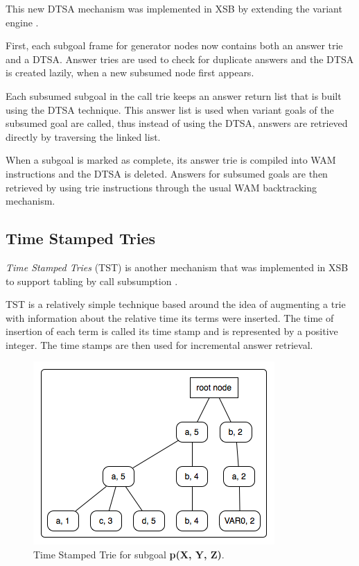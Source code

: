   This new DTSA mechanism was implemented in XSB by extending the variant engine \cite{Rao-96}.
  
  First, each subgoal frame for generator nodes now contains both an answer trie and a DTSA.
  Answer tries are used to check for duplicate answers and the DTSA is created lazily, when a new subsumed node
  first appears.
  
  Each subsumed subgoal in the call trie keeps an answer return list that is built using the DTSA technique.
  This answer list is used when variant goals of the subsumed goal are called, thus instead of using
  the DTSA, answers are retrieved directly by traversing the linked list.
  
  When a subgoal is marked as complete, its answer trie is compiled into WAM instructions and the DTSA is deleted.
  Answers for subsumed goals are then retrieved by using trie instructions through the usual WAM backtracking
  mechanism.
  
\subsection{Time Stamped Tries} \label{sec:time_stamped_tries}

  \textit{Time Stamped Tries} (TST) is another mechanism that was implemented in XSB
  to support tabling by call subsumption \cite{Johnson-99}.
  
  TST is a relatively simple technique based around the idea of augmenting a trie with information about the relative time
  its terms were inserted. The time of insertion of each term is called its time stamp and is represented by a
  positive integer. The time stamps are then used for incremental answer retrieval.
  
  \begin{figure}[ht]
    \centering
      \includegraphics[scale=0.6]{tst_1.png}
    \caption{Time Stamped Trie for subgoal \textbf{p(X, Y, Z)}.}
    \label{fig:tst_1}
  \end{figure}
  
